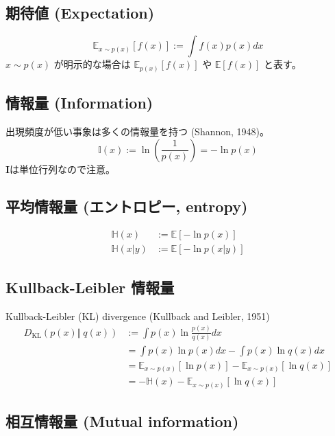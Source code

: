 \subsection{期待値 (Expectation)}$$
\mathbb{E}_{x\sim p(x)}\left[f(x)\right]:=\int f(x)p(x)dx
$$
$x\sim p(x)$ が明示的な場合は $\mathbb{E}_{p(x)}\left[f(x)\right]$ や $\mathbb{E}\left[f(x)\right]$ と表す。
\subsection{情報量 (Information)}出現頻度が低い事象は多くの情報量を持つ (Shannon, 1948)。
$$
\mathbb{I}(x):=\ln\left(\frac{1}{p(x)}\right)=-\ln p(x)
$$
$\mathbf{I}$は単位行列なので注意。
\subsection{平均情報量 (エントロピー, entropy)}$$
\begin{align}
\mathbb{H}(x)&:=\mathbb{E}[-\ln p(x)]\\
\mathbb{H}(x\vert y)&:=\mathbb{E}[-\ln p(x\vert y)]
\end{align}
$$
\subsection{Kullback-Leibler 情報量}Kullback-Leibler (KL) divergence (Kullback and Leibler, 1951)
$$
\begin{align}
D_{\text{KL}}\left(p(x) \Vert\ q(x)\right)&:=\int p(x) \ln \frac{p(x)}{q(x)} dx\\
&=\int p(x) \ln p(x) dx-\int p(x) \ln q(x) dx\\
&=\mathbb{E}_{x\sim p(x)}[\ln p(x)]-\mathbb{E}_{x\sim p(x)}[\ln q(x)]\\
&=-\mathbb{H}(x)-\mathbb{E}_{x\sim p(x)}[\ln q(x)]
\end{align}
$$
\subsection{相互情報量 (Mutual information)}